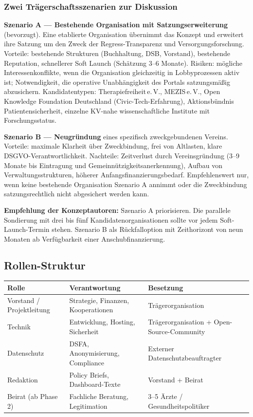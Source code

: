 \documentclass{umbruch-position}
\begin{document}
\subsubsection{Zwei Trägerschaftsszenarien zur Diskussion}

\textbf{Szenario A --- Bestehende Organisation mit Satzungserweiterung} (bevorzugt). Eine etablierte Organisation übernimmt das Konzept und erweitert ihre Satzung um den Zweck der Regress-Transparenz und Versorgungsforschung. Vorteile: bestehende Strukturen (Buchhaltung, DSB, Vorstand), bestehende Reputation, schnellerer Soft Launch (Schätzung 3--6 Monate). Risiken: mögliche Interessenkonflikte, wenn die Organisation gleichzeitig in Lobbyprozessen aktiv ist; Notwendigkeit, die operative Unabhängigkeit des Portals satzungsmäßig abzusichern. Kandidatentypen: Therapiefreiheit\,e.\,V., MEZIS\,e.\,V., Open Knowledge Foundation Deutschland (Civic-Tech-Erfahrung), Aktionsbündnis Patientensicherheit, einzelne KV-nahe wissenschaftliche Institute mit Forschungsstatus.

\textbf{Szenario B --- Neugründung} eines spezifisch zweckgebundenen Vereins. Vorteile: maximale Klarheit über Zweckbindung, frei von Altlasten, klare DSGVO-Verantwortlichkeit. Nachteile: Zeitverlust durch Vereinsgründung (3--9 Monate bis Eintragung und Gemeinnützigkeitsanerkennung), Aufbau von Verwaltungsstrukturen, höherer Anfangsfinanzierungsbedarf. Empfehlenswert nur, wenn keine bestehende Organisation Szenario A annimmt oder die Zweckbindung satzungsrechtlich nicht abgesichert werden kann.

\textbf{Empfehlung der Konzeptautoren:} Szenario A priorisieren. Die parallele Sondierung mit drei bis fünf Kandidatenorganisationen sollte vor jedem Soft-Launch-Termin stehen. Szenario B als Rückfalloption mit Zeithorizont von neun Monaten ab Verfügbarkeit einer Anschubfinanzierung.

\subsection{Rollen-Struktur}

{\small
\begin{tabularx}{\textwidth}{X X X}
\toprule
\textbf{Rolle} & \textbf{Verantwortung} & \textbf{Besetzung} \\
\midrule
Vorstand / Projektleitung & Strategie, Finanzen, Kooperationen & Trägerorganisation \\
Technik & Entwicklung, Hosting, Sicherheit & Trägerorganisation + Open-Source-Community \\
Datenschutz & DSFA, Anonymisierung, Compliance & Externer Datenschutzbeauftragter \\
Redaktion & Policy Briefs, Dashboard-Texte & Vorstand + Beirat \\
Beirat (ab Phase 2) & Fachliche Beratung, Legitimation & 3--5 Ärzte / Gesundheitspolitiker \\
\bottomrule
\end{tabularx}
}
\end{document}
